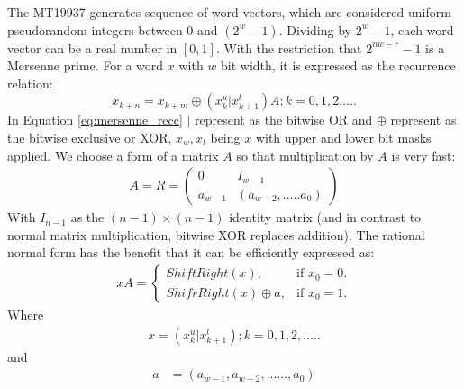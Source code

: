 \documentclass[12pt,journal,compsoc]{IEEEtran}
\begin{document}
The MT19937 generates sequence of word vectors, which are considered uniform pseudorandom integers between $0$ and $(2^{w}-1)$\cite{MT19937}. Dividing by $2^{w}-1$, each word vector can be a real number in $[0, 1]$. With the restriction that $2^{nw-r}-1$ is a Mersenne prime. For a word $x$ with $w$ bit width, it is expressed as the recurrence relation:
\begin{equation}
\label{eq:mersenne_recc}
x_{k+n} =  x_{k+m} \oplus (x^{u}_{k} | x^{l}_{k+1})A; k=0,1,2.....
\end{equation}
In Equation \ref{eq:mersenne_recc} $|$ represent as the bitwise OR and $\oplus$ represent as the bitwise exclusive or XOR, $x_w, x_l$ being $x$ with upper and lower bit masks applied. We choose a form of a matrix $A$ so that multiplication by $A$ is very fast:
\begin{align}
A = R = \begin{pmatrix} 0 & I_{w-1} \\ a_{w-1} & (a_{w-2},.....a_{0}) \end{pmatrix} 
\end{align}
With $I_{n-1}$ as the $(n-1) \times (n-1)$ identity matrix (and in contrast to normal matrix multiplication, bitwise XOR replaces addition). The rational normal form has the benefit that it can be efficiently expressed as:
\begin{align}
xA = \begin{cases}
	ShiftRight(x), & \text{if $x_0 = 0$}.\\
    	ShifrRight(x)\oplus a, & \text{if $x_{0} = 1$}.
	\end{cases}
\end{align}
Where
\begin{align}
x = (x^{u}_{k} | x^{l}_{k+1}); k = 0, 1, 2, .....
\end{align}
and
\begin{align*}
a &= (a_{w-1}, a_{w-2}, ......, a_{0}) \\
\end{align*}
\end{document}

